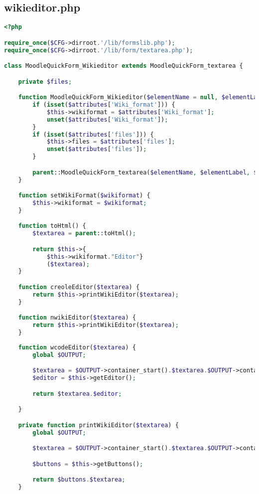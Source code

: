 \subsection{wikieditor.php}
\begin{lstlisting}[language=PHP]
<?php

require_once($CFG->dirroot.'/lib/formslib.php');
require_once($CFG->dirroot.'/lib/form/textarea.php');

class MoodleQuickForm_Wikieditor extends MoodleQuickForm_textarea {

    private $files;

    function MoodleQuickForm_Wikieditor($elementName = null, $elementLabel = null, $attributes = null) {
        if (isset($attributes['Wiki_format'])) {
            $this->wikiformat = $attributes['Wiki_format'];
            unset($attributes['Wiki_format']);
        }
        if (isset($attributes['files'])) {
            $this->files = $attributes['files'];
            unset($attributes['files']);
        }

        parent::MoodleQuickForm_textarea($elementName, $elementLabel, $attributes);
    }

    function setWikiFormat($wikiformat) {
        $this->wikiformat = $wikiformat;
    }

    function toHtml() {
        $textarea = parent::toHtml();

        return $this->{
            $this->wikiformat."Editor"}
            ($textarea);
    }

    function creoleEditor($textarea) {
        return $this->printWikiEditor($textarea);
    }

    function nwikiEditor($textarea) {
        return $this->printWikiEditor($textarea);
    }
	
	function wcodeEditor($textarea) {
		global $OUTPUT;

        $textarea = $OUTPUT->container_start().$textarea.$OUTPUT->container_end();
		$editor = $this->getEditor();

        return $textarea.$editor;

	}

    private function printWikiEditor($textarea) {
        global $OUTPUT;

        $textarea = $OUTPUT->container_start().$textarea.$OUTPUT->container_end();

        $buttons = $this->getButtons();

        return $buttons.$textarea;
    }
	

\end{lstlisting}
